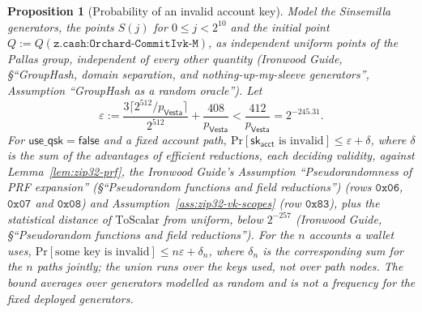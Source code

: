 \documentclass[11pt,a4paper]{article}
\newtheorem{proposition}[theorem]{Proposition}
\theoremstyle{definition}
\renewcommand{\Pr}{\mathrm{Pr}}
\newcommand{\Vesta}{\ensuremath{\mathsf{Vesta}}}
\begin{document}
\begin{proposition}[Probability of an invalid account key]%
\label{prop:zip32-invalid}
Model the Sinsemilla generators, the points $S(j)$ for $0 \le j < 2^{10}$
and the initial point $Q := Q(\texttt{z.cash:Orchard-CommitIvk-M})$, as
independent uniform points of the Pallas group,
independent of every other quantity (\emph{Ironwood Guide}, \S``GroupHash,
domain separation, and nothing-up-my-sleeve generators'', Assumption ``GroupHash
as a random oracle''). Let
\[
  \varepsilon := \frac{3 \lceil 2^{512} / p_{\Vesta} \rceil}{2^{512}}
    + \frac{408}{p_{\Vesta}} < \frac{412}{p_{\Vesta}} = 2^{-245.31}.
\]
For $\mathsf{use\_qsk} = \mathsf{false}$ and a fixed account path,
$\Pr[\mathsf{sk}_{\mathsf{acct}} \text{ is invalid}] \le \varepsilon +
\delta$, where $\delta$ is the sum of the advantages of efficient
reductions, each deciding validity, against Lemma~\ref{lem:zip32-prf}, the
\emph{Ironwood Guide}'s Assumption ``Pseudorandomness of PRF expansion''
(\S``Pseudorandom functions and field reductions'') (rows $\mathtt{0x06}$,
$\mathtt{0x07}$ and $\mathtt{0x08}$) and Assumption~\ref{ass:zip32-vk-scopes}
(row $\mathtt{0x83}$), plus the statistical distance of $\mathrm{ToScalar}$ from
uniform, below $2^{-257}$ (\emph{Ironwood Guide}, \S``Pseudorandom functions and
field reductions''). For the $n$ accounts a wallet uses, $\Pr[\text{some key is
invalid}] \le n\varepsilon + \delta_n$, where $\delta_n$ is the corresponding
sum for the $n$ paths jointly; the union runs over the keys used, not over path
nodes. The bound averages over generators modelled as random and is not a
frequency for the fixed deployed generators.
\end{proposition}
\end{document}
